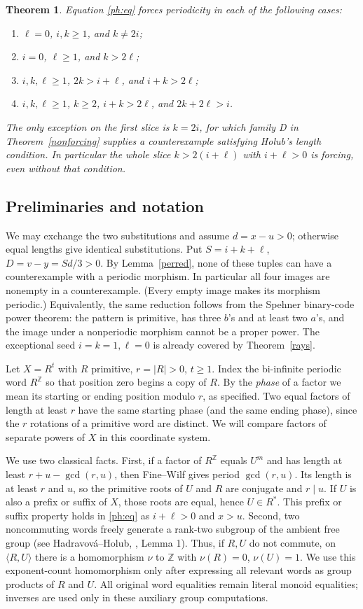 \documentclass[10pt]{article}
\newtheorem{theorem}{Theorem}
\theoremstyle{remark}\newtheorem*{remark}{Remark}
\begin{document}
\begin{theorem}\label{ph:main}
Equation \eqref{ph:eq} forces periodicity in each of the following cases:
\begin{enumerate}
\item $\ell=0$, $i,k\ge1$, and $k\ne2i$;
\item $i=0$, $\ell\ge1$, and $k>2\ell$;
\item $i,k,\ell\ge1$, $2k>i+\ell$, and $i+k>2\ell$;
\item $i,k,\ell\ge1$, $k\ge2$, $i+k>2\ell$, and $2k+2\ell>i$.
\end{enumerate}
The only exception on the first slice is $k=2i$, for which family D in
Theorem~\ref{nonforcing} supplies a counterexample satisfying Holub's
length condition. In particular the whole slice $k>2(i+\ell)$ with
$i+\ell>0$ is forcing, even without that condition.
\end{theorem}

\subsection{Preliminaries and notation}
We may exchange the two substitutions and assume $d=x-u>0$;
otherwise equal lengths give identical substitutions. Put
$S=i+k+\ell$, $D=v-y=Sd/3>0$. By Lemma~\ref{perred}, none of
these tuples can have a counterexample with a periodic morphism.
In particular all four images are nonempty in a counterexample. (Every
empty image makes its morphism periodic.) Equivalently, the same
reduction follows from the Spehner binary-code power theorem: the
pattern is primitive, has three $b$'s and at least two $a$'s, and the
image under a nonperiodic morphism cannot be a proper power.
The exceptional seed $i=k=1,\ell=0$ is already covered by
Theorem~\ref{rays}.

Let $X=R^t$ with $R$ primitive, $r=|R|>0$, $t\ge1$. Index the
bi-infinite periodic word $R^{\mathbb Z}$ so that position zero begins a
copy of $R$. By the \emph{phase} of a factor we mean its starting or
ending position modulo $r$, as specified. Two equal factors of length
at least $r$ have the same starting phase (and the same ending phase),
since the $r$ rotations of a primitive word are distinct. We will
compare factors of separate powers of $X$ in this coordinate system.

We use two classical facts. First, if a factor of $R^{\mathbb Z}$ equals
$U^m$ and has length at least $r+u-\gcd(r,u)$, then Fine--Wilf gives
period $\gcd(r,u)$. Its length is at least $r$ and $u$, so the primitive
roots of $U$ and $R$ are conjugate and $r\mid u$. If $U$ is also a prefix
or suffix of $X$, those roots are equal, hence $U\in R^*$. This prefix
or suffix property holds in \eqref{ph:eq} as $i+\ell>0$ and $x>u$.
Second, two noncommuting words freely generate a rank-two subgroup of
the ambient free group (see Hadravov\'a--Holub, \cite{hh}, Lemma 1).
Thus, if $R,U$ do not commute, on $\langle R,U\rangle$ there is a
homomorphism $\nu$ to $\mathbb Z$ with $\nu(R)=0$, $\nu(U)=1$.
We use this exponent-count homomorphism only after expressing all
relevant words as group products of $R$ and $U$. All original word
equalities remain literal monoid equalities; inverses are used only in
these auxiliary group computations.
\end{document}
